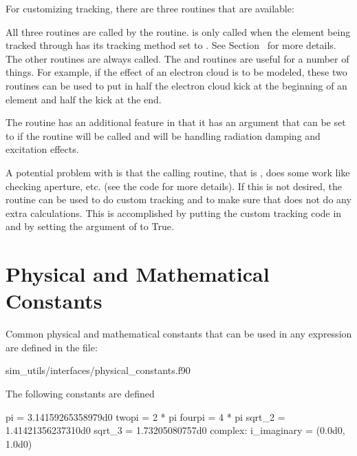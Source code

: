 {{{{{{For customizing tracking, there are three routines that are available:
\begin{example}
\end{example}
All three routines are called by the  routine.
 is only called when the element being tracked
through has its tracking method set to . See
Section~ for more details. The other routines are
always called. The  and 
routines are useful for a number of things. For example, if the effect
of an electron cloud is to be modeled, these two routines can
be used to put in half the electron cloud kick at the beginning of
an element and half the kick at the end.

The routine  has an additional feature in that
it has an argument  that can be set to 
if the routine  will be called and  will
be handling radiation damping and excitation effects.

A potential problem with  is that the calling
routine, that is , does some work like checking aperture,
etc. (see the  code for more details). If this is not
desired, the  routine can be used to do custom
tracking and to make sure that  does not do any extra
calculations. This is accomplished by putting the custom tracking code
in  and by setting the  argument of
 to True. 

\section{Physical and Mathematical Constants}
\label{s:physical.constants}

Common physical and mathematical constants that can be used in any expression
are defined in the file:
\begin{example}
 sim_utils/interfaces/physical_constants.f90
\end{example}

The following constants are defined
\begin{example}
  pi = 3.14159265358979d0
  twopi = 2 * pi
  fourpi = 4 * pi
  sqrt_2 = 1.41421356237310d0
  sqrt_3 = 1.73205080757d0
  complex: i_imaginary = (0.0d0, 1.0d0)


\end{example}}}}}}}
